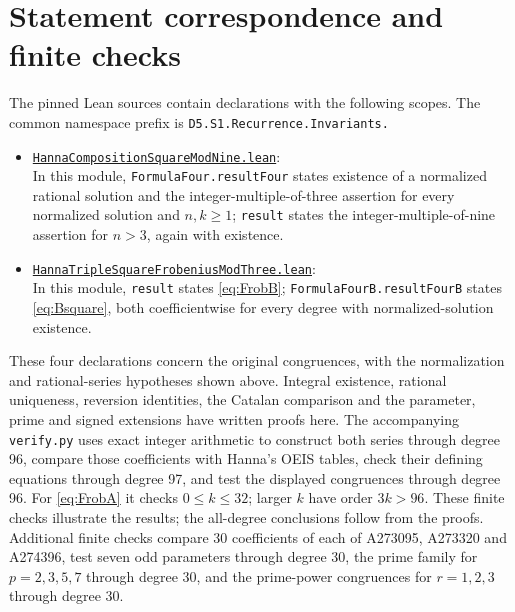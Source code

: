 \documentclass[11pt]{article}
\begin{document}
\section{Statement correspondence and finite checks}
The pinned Lean sources contain declarations with the following scopes.
The common namespace prefix is
\texttt{D5.S1.Recurrence.Invariants.}
\begin{itemize}
\item \href{https://github.com/the-omega-institute/trureturing/blob/074df09ddbbef1843ddb383577bfaa827f753e36/D5/S1/Recurrence/Invariants/HannaCompositionSquareModNine.lean}{\texttt{HannaCompositionSquareModNine.lean}}:\\
In this module,
\texttt{FormulaFour.resultFour} states existence of a normalized rational
solution and the integer-multiple-of-three assertion for every normalized
solution and $n,k\geq1$; \texttt{result} states the integer-multiple-of-nine
assertion for $n>3$, again with existence.
\item \href{https://github.com/the-omega-institute/trureturing/blob/074df09ddbbef1843ddb383577bfaa827f753e36/D5/S1/Recurrence/Invariants/HannaTripleSquareFrobeniusModThree.lean}{\texttt{HannaTripleSquareFrobeniusModThree.lean}}:\\
In this module,
\texttt{result} states \eqref{eq:FrobB};
\texttt{FormulaFourB.resultFourB} states \eqref{eq:Bsquare}, both
coefficientwise for every degree with normalized-solution existence.
\end{itemize}
These four declarations concern the original congruences, with the
normalization and rational-series hypotheses shown above. Integral
existence, rational uniqueness, reversion identities, the Catalan comparison
and the parameter, prime and signed extensions have written proofs here.
The accompanying \texttt{verify.py}
uses exact integer arithmetic to construct both series through degree 96,
compare those coefficients with Hanna's OEIS tables, check their defining
equations through degree 97, and test the displayed congruences through
degree 96. For \eqref{eq:FrobA} it checks $0\leq k\leq32$; larger $k$
have order $3k>96$. These finite checks illustrate the results; the
all-degree conclusions follow from the proofs. Additional finite checks
compare 30 coefficients of each of A273095, A273320 and A274396, test seven
odd parameters through degree 30, the prime family for $p=2,3,5,7$ through
degree 30, and the prime-power congruences for $r=1,2,3$ through degree 30.
\end{document}
